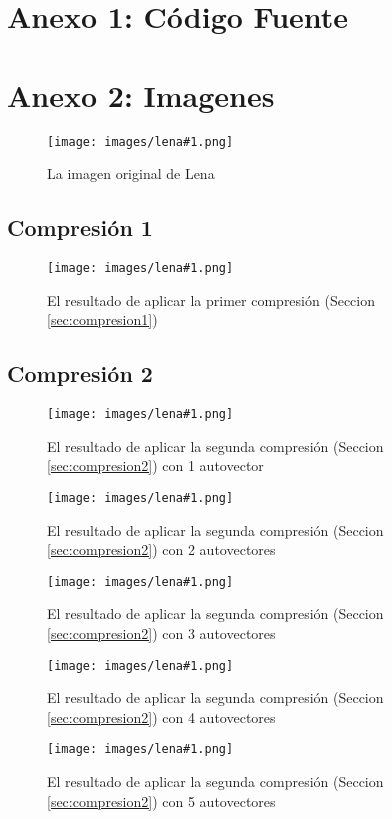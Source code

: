 \documentclass[twocolumn,a4paper,10pt]{article}
\begin{document}
\newpage
\section*{Anexo 1: Código Fuente}
    
    
    

\newpage
\section*{Anexo 2: Imagenes}

\newcommand{\lena}[2]{
    \begin{figure}[H]
        \texttt{[image: images/lena\#1.png]}
        \caption{#2}
        \label{fig:lena#1}
    \end{figure}
}

\newcommand{\autoimage}[2]{
    \begin{figure}[H]
        \texttt{[image: images/autoimage\#1.png]}
        \caption{#2}
        \label{fig:lena#1}
    \end{figure}
}

\lena{512}{La imagen original de Lena}

\subsection{Compresi\'on 1}

\lena{-bruta}{El resultado de aplicar la primer compresi\'on (Seccion \ref{sec:compresion1})}

\subsection{Compresi\'on 2}

\lena{-eig-1}{El resultado de aplicar la segunda compresi\'on (Seccion \ref{sec:compresion2}) con 1 autovector}
\lena{-eig-2}{El resultado de aplicar la segunda compresi\'on (Seccion \ref{sec:compresion2}) con 2 autovectores}
\lena{-eig-3}{El resultado de aplicar la segunda compresi\'on (Seccion \ref{sec:compresion2}) con 3 autovectores}
\lena{-eig-4}{El resultado de aplicar la segunda compresi\'on (Seccion \ref{sec:compresion2}) con 4 autovectores}
\lena{-eig-5}{El resultado de aplicar la segunda compresi\'on (Seccion \ref{sec:compresion2}) con 5 autovectores}
\end{document}
